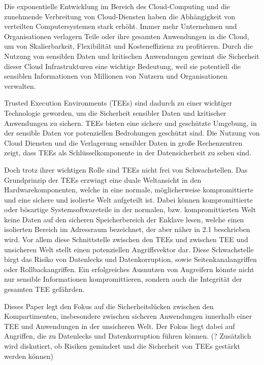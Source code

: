 Die exponentielle Entwicklung im Bereich des Cloud-Computing und die zunehmende Verbreitung von Cloud-Diensten haben die Abhängigkeit von verteilten Computersystemen stark erhöht. Immer mehr Unternehmen und Organisationen verlagern Teile oder ihre gesamten Anwendungen in die Cloud, um von Skalierbarkeit, Flexibilität und Kosteneffizienz zu profitieren. Durch die Nutzung von sensiblen Daten und kritischen Anwendungen gewinnt die Sicherheit dieser Cloud Infrastrukturen eine wichtige Bedeutung, weil sie potentiell die sensiblen Informationen von Millionen von Nutzern und Organisationen verwalten. 

Trusted Execution Environments (TEEs) sind dadurch zu einer wichtiger Technologie geworden, um die Sicherheit sensibler Daten und kritischer Anwendungen zu sichern. TEEs bieten eine sichere und geschützte Umgebung, in der sensible Daten vor potenziellen Bedrohungen geschützt sind. Die Nutzung von Cloud Diensten und die Verlagerung sensibler Daten in große Rechenzentren zeigt, dass TEEs als Schlüsselkomponente in der Datensicherheit zu sehen sind.

Doch trotz ihrer wichtigen Rolle sind TEEs nicht frei von Schwachstellen. Das Grundprinzip der TEEs erzwingt eine duale Weltansicht in den Hardwarekomponenten, welche in eine normale, möglicherweise kompromittierte und eine sichere und isolierte Welt aufgeteilt ist. Dabei können kompromittierte oder bösartige Systemsoftwareteile in der normalen, bzw. kompromittierten Welt keine Daten auf den sicheren Speicherbereich der Enklave lesen, welche einen isolierten Bereich im Adressraum bezeichnet, der aber näher in 2.1 beschrieben wird. Vor allem diese Schnittstelle zwischen den TEEs und zwischen TEE und unsicheren Welt stellt einen potenziellen Angriffsvektor dar. Diese Schwachstelle birgt das Risiko von Datenlecks und Datenkorruption, sowie Seitenkanalangriffen oder Rollbackangriffen. Ein erfolgreiches Ausnutzen von Angreifern könnte nicht nur sensible Informationen kompromittieren, sondern auch die Integrität der gesamten TEE gefährden. 

Dieses Paper legt den Fokus auf die Sicherheitslücken zwischen den Kompartimenten, insbesondere zwischen sicheren Anwendungen innerhalb einer TEE und Anwendungen in der unsicheren Welt. Der Fokus liegt dabei auf Angriffen, die zu Datenlecks und Datenkorruption führen können. (? Zusätzlich wird diskutiert, ob Risiken gemindert und die Sicherheit von TEEs gestärkt werden können)